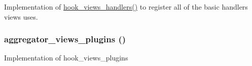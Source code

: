 Implementation of \hyperlink{group__views__hooks_gbf506f44bd8d8a86876f27396f5341ed}{hook\_\-views\_\-handlers()} to register all of the basic handlers views uses. \hypertarget{group__views__aggregator__module_g1260b78865a34f57c44780293ea022b2}{
\subsubsection[{aggregator\_\-views\_\-plugins}]{\setlength{\rightskip}{0pt plus 5cm}aggregator\_\-views\_\-plugins ()}}
\label{group__views__aggregator__module_g1260b78865a34f57c44780293ea022b2}


Implementation of hook\_\-views\_\-plugins 